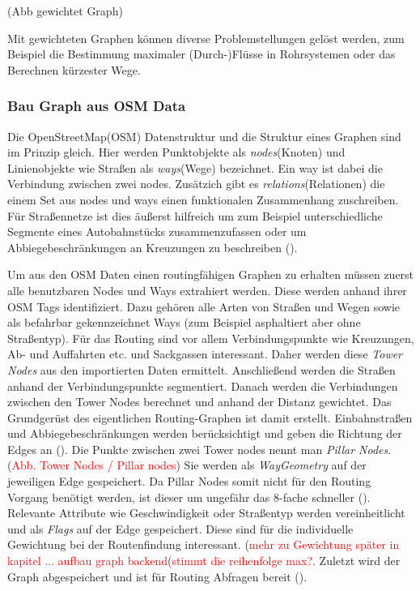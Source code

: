 \documentclass[10pt,a4paper]{article}
\newcommand\todo[1]{\textcolor{red}{#1}}
\begin{document}
(Abb gewichtet Graph)

Mit gewichteten Graphen können diverse Problemstellungen gelöst werden, zum Beispiel die Bestimmung maximaler (Durch-)Flüsse in Rohrsystemen oder das Berechnen kürzester Wege.

\subsubsection{Bau Graph aus OSM Data}

Die OpenStreetMap(OSM) Datenstruktur und die Struktur eines Graphen sind im Prinzip gleich. Hier werden Punktobjekte als \textit{nodes}(Knoten) und Linienobjekte wie Straßen als \textit{ways}(Wege) bezeichnet. Ein way ist dabei die Verbindung zwischen zwei nodes. Zusätzich gibt es \textit{relations}(Relationen) die einem Set aus nodes und ways einen funktionalen Zusammenhang zuschreiben. Für Straßennetze ist dies äußerst hilfreich um zum Beispiel unterschiedliche Segmente eines Autobahnstücks zusammenzufassen oder um Abbiegebeschränkungen an Kreuzungen zu beschreiben (\cite{osmrelation}).

Um aus den OSM Daten einen routingfähigen Graphen zu erhalten müssen zuerst alle benutzbaren Nodes und Ways extrahiert werden. Diese werden anhand ihrer OSM Tags identifiziert. Dazu gehören alle Arten von Straßen und Wegen sowie als befahrbar gekennzeichnet Ways (zum Beispiel asphaltiert aber ohne Straßentyp). Für das Routing sind vor allem Verbindungspunkte wie Kreuzungen, Ab- und Auffahrten etc. und Sackgassen interessant. Daher werden diese \textit{Tower Nodes} aus den importierten Daten ermittelt. Anschließend werden die Straßen anhand der Verbindungspunkte segmentiert. Danach werden die Verbindungen zwischen den Tower Nodes berechnet und anhand der Distanz gewichtet. Das Grundgerüst des eigentlichen Routing-Graphen ist damit erstellt. Einbahnstraßen und Abbiegebeschränkungen werden berücksichtigt und geben die Richtung der Edges an (\cite{osmgraph}). Die Punkte zwischen zwei Tower nodes nennt man \textit{Pillar Nodes}.(\todo{Abb. Tower Nodes / Pillar nodes}) Sie werden als \textit{WayGeometry} auf der jeweiligen Edge gespeichert. Da Pillar Nodes somit nicht für den Routing Vorgang benötigt werden, ist dieser um ungefähr das 8-fache schneller (\cite{graphhopper}). Relevante Attribute wie Geschwindigkeit oder Straßentyp werden vereinheitlicht und als \textit{Flags} auf der Edge gespeichert. Diese sind für die individuelle Gewichtung bei der Routenfindung interessant.  (\todo{mehr zu Gewichtung später in kapitel ... aufbau graph backend}(\todo{stimmt die reihenfolge max?}. Zuletzt wird der Graph abgespeichert und ist für Routing Abfragen bereit (\cite{osmgraph}). 
\end{document}
